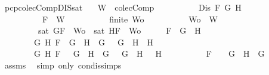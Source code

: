 \begin{isabellebody}
\begin{isamarkuptext}
\end{isamarkuptext}\isamarkuptrue%
\isamarkupfalse%
\ pcp{\isacharunderscore}colecComp{\isacharunderscore}DIS{\isacharunderscore}sat{\isacharcolon}\isanewline
\ \ \ {\isachardoublequoteopen}W\ {\isasymin}\ colecComp{\isachardoublequoteclose}\isanewline
\ \ \ \ \ \ \ \ \ \ {\isachardoublequoteopen}Dis\ F\ G\ H{\isachardoublequoteclose}\isanewline
\ \ \ \ \ \ \ \ \ \ {\isachardoublequoteopen}F\ {\isasymin}\ W{\isachardoublequoteclose}\isanewline
\ \ \ \ \ \ \ \ \ \ {\isachardoublequoteopen}finite\ Wo{\isachardoublequoteclose}\isanewline
\ \ \ \ \ \ \ \ \ \ {\isachardoublequoteopen}Wo\ {\isasymsubseteq}\ W{\isachardoublequoteclose}\isanewline
\ \ \ \ \ \ \ \ \ {\isachardoublequoteopen}sat\ {\isacharparenleft}{\isacharbraceleft}G{\isacharcomma}F{\isacharbraceright}\ {\isasymunion}\ Wo{\isacharparenright}\ {\isasymor}\ sat\ {\isacharparenleft}{\isacharbraceleft}H{\isacharcomma}F{\isacharbraceright}\ {\isasymunion}\ Wo{\isacharparenright}{\isachardoublequoteclose}\isanewline
%
\isadelimproof
%
\endisadelimproof
%
\isatagproof
{}\isamarkupfalse%
\ {\isacharminus}\isanewline
\ \ \isamarkupfalse%
\ {\isachardoublequoteopen}{\isacharparenleft}F\ {\isacharequal}\ G\ \isactrlbold {\isasymor}\ H\ {\isasymor}\ \isanewline
\ \ \ \ \ \ \ \ {\isacharparenleft}{\isasymexists}G{}\ H{}{\isachardot}\ F\ {\isacharequal}\ G{}\ \isactrlbold {\isasymrightarrow}\ H{}\ {\isasymand}\ G\ {\isacharequal}\ \isactrlbold {\isasymnot}\ G{}\ {\isasymand}\ H\ {\isacharequal}\ H{}{\isacharparenright}\ {\isasymor}\ \isanewline
\ \ \ \ \ \ \ \ {\isacharparenleft}{\isasymexists}G{}\ H{}{\isachardot}\ F\ {\isacharequal}\ \isactrlbold {\isasymnot}\ {\isacharparenleft}G{}\ \isactrlbold {\isasymand}\ H{}{\isacharparenright}\ {\isasymand}\ G\ {\isacharequal}\ \isactrlbold {\isasymnot}\ G{}\ {\isasymand}\ H\ {\isacharequal}\ \isactrlbold {\isasymnot}\ H{}{\isacharparenright}\ {\isasymor}\ \isanewline
\ \ \ \ \ \ \ \ F\ {\isacharequal}\ \isactrlbold {\isasymnot}\ {\isacharparenleft}\isactrlbold {\isasymnot}\ G{\isacharparenright}\ {\isasymand}\ H\ {\isacharequal}\ G{\isacharparenright}{\isachardoublequoteclose}\isanewline
\ \ \ \ \isamarkupfalse%
\ assms{\isacharparenleft}{}{\isacharparenright}\ \isamarkupfalse%
\ {\isacharparenleft}simp\ only{\isacharcolon}\ con{\isacharunderscore}dis{\isacharunderscore}simps{\isacharparenleft}{}{\isacharparenright}{\isacharparenright}\isanewline

\end{isabellebody}
